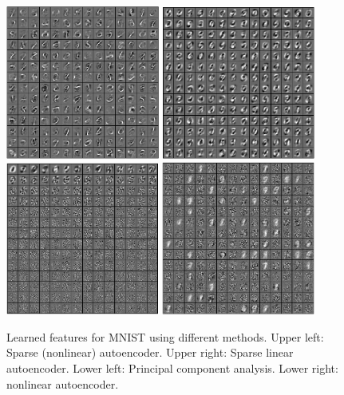 \documentclass[twocolumn]{article}
\begin{document}
\begin{figure}
  \centering
  \includegraphics[width=0.45\textwidth]{sparsesigmoidnn.png}
  \includegraphics[width=0.45\textwidth]{linearnn.png}
  \includegraphics[width=0.45\textwidth]{pca.png}
  \includegraphics[width=0.45\textwidth]{nonlinearnn.png}
  \caption{Learned features for MNIST using different methods.
      Upper left: Sparse (nonlinear) autoencoder.
      Upper right: Sparse linear autoencoder.
      Lower left: Principal component analysis.
      Lower right: nonlinear autoencoder.
    }
  \label{fig:features}
\end{figure}



\end{document}

